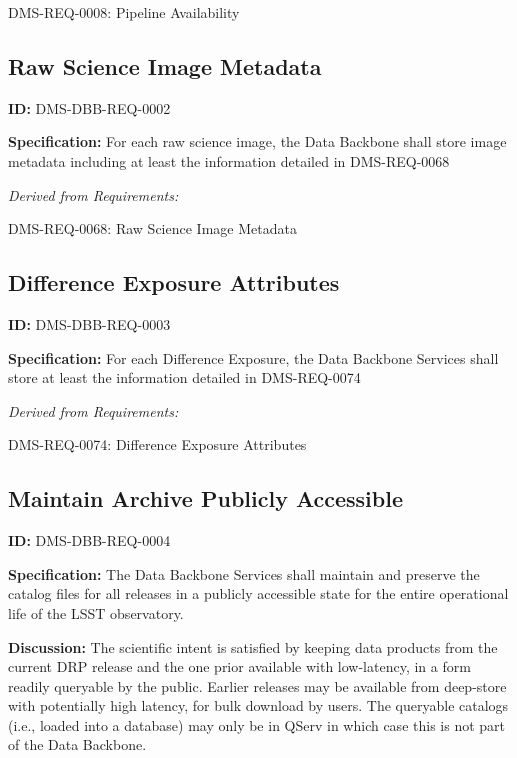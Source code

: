 \documentclass[SE,toc]{lsstdoc}
\begin{document}
DMS-REQ-0008:
Pipeline Availability \newline

\subsection{Raw Science Image Metadata}

\label{DMS-DBB-REQ-0002}
\textbf{ID:} DMS-DBB-REQ-0002

\textbf{Specification:}
For each raw science image, the Data Backbone shall store image metadata including at least the information detailed in DMS-REQ-0068

\emph{Derived from Requirements:}

DMS-REQ-0068:
Raw Science Image Metadata \newline

\subsection{Difference Exposure Attributes}

\label{DMS-DBB-REQ-0003}
\textbf{ID:} DMS-DBB-REQ-0003

\textbf{Specification:}
For each Difference Exposure, the Data Backbone Services shall store at least the information detailed in DMS-REQ-0074

\emph{Derived from Requirements:}

DMS-REQ-0074:
Difference Exposure Attributes \newline

\subsection{Maintain Archive Publicly Accessible}

\label{DMS-DBB-REQ-0004}
\textbf{ID:} DMS-DBB-REQ-0004

\textbf{Specification:}
The Data Backbone Services shall maintain and preserve the catalog files for all releases in a publicly accessible state for the entire operational life of the LSST observatory.

\textbf{Discussion:}
The scientific intent is satisfied by keeping data products from the current DRP release and the one prior available with low-latency, in a form readily queryable by the public. Earlier releases may be available from deep-store with potentially high latency, for bulk download by users.    The queryable catalogs (i.e., loaded into a database) may only be in QServ in which case this is not part of the Data Backbone.
\end{document}

